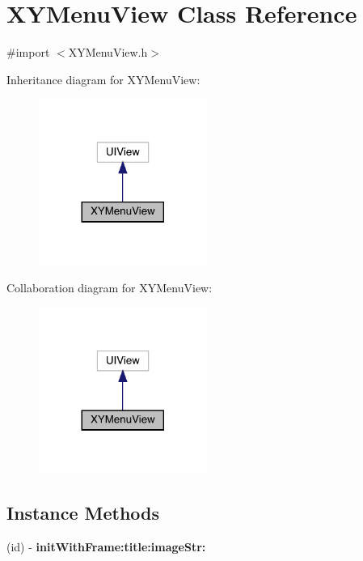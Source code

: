 \hypertarget{interface_x_y_menu_view}{}\section{X\+Y\+Menu\+View Class Reference}
\label{interface_x_y_menu_view}


{\ttfamily \#import $<$X\+Y\+Menu\+View.\+h$>$}



Inheritance diagram for X\+Y\+Menu\+View\+:\nopagebreak
\begin{figure}[H]
\begin{center}
\leavevmode
\includegraphics[width=156pt]{interface_x_y_menu_view__inherit__graph}
\end{center}
\end{figure}


Collaboration diagram for X\+Y\+Menu\+View\+:\nopagebreak
\begin{figure}[H]
\begin{center}
\leavevmode
\includegraphics[width=156pt]{interface_x_y_menu_view__coll__graph}
\end{center}
\end{figure}
\subsection*{Instance Methods}
\begin{DoxyCompactItemize}
\item 
\mbox{\label{interface_x_y_menu_view_a43048a00e484482fdd81c7900a5ba0df}} 
(id) -\/ {\bfseries init\+With\+Frame\+:title\+:image\+Str\+:}
\end{DoxyCompactItemize}

